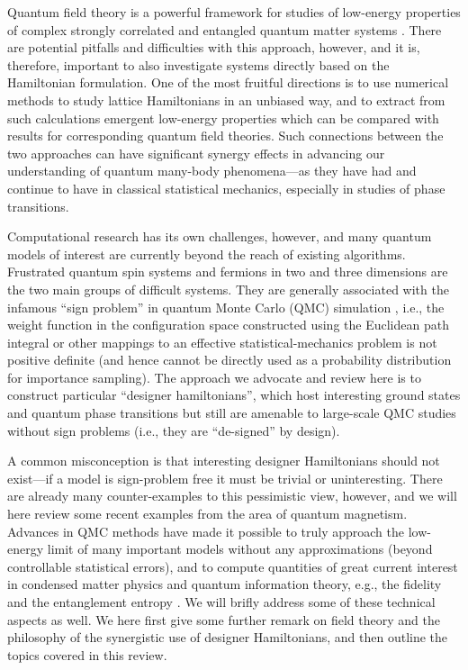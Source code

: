 \documentclass[range]{ar2e}
\begin{document}
Quantum field theory is a powerful framework for studies of low-energy properties of complex strongly 
correlated and entangled quantum matter systems \cite{Sachdev11}. There are potential pitfalls and difficulties 
with this approach, however, and it is, therefore, important to also investigate systems directly based on the Hamiltonian 
formulation. One of the most fruitful directions is to use numerical methods to study lattice Hamiltonians 
in an unbiased way, and to extract from such calculations emergent low-energy properties which can be 
compared with results for corresponding quantum field theories. Such connections between the two approaches 
can have significant synergy effects in advancing our understanding of quantum many-body phenomena---as they
have had and continue to have in classical statistical mechanics, especially in studies of phase transitions. 

Computational research has its own challenges, however, and many quantum models of interest are currently beyond the reach 
of existing algorithms. Frustrated quantum spin systems and fermions in two and three dimensions are the two main groups 
of difficult systems. They are generally associated with the infamous ``sign problem'' in quantum Monte Carlo (QMC) simulation
\cite{Loh90,Henelius00,Nyfeler08}, i.e., the weight function in the configuration space constructed using the Euclidean path 
integral or other mappings to an effective statistical-mechanics problem is not positive definite (and hence cannot be directly 
used as a probability distribution for importance sampling). The approach we advocate and review here is to construct particular 
``designer hamiltonians'', which host interesting ground states and quantum phase transitions but still are amenable to 
large-scale QMC studies without sign problems (i.e., they are ``de-signed'' by design). 

A common misconception is that interesting designer Hamiltonians should not exist---if a model is sign-problem 
free it must be trivial or uninteresting. There are already many counter-examples to this pessimistic view, 
however, and we will here review some recent examples from the area of quantum magnetism. Advances in QMC 
methods \cite{Sandvik91,Evertz93,Beard96,WormA,Sandvik99,Sandvik10a} have made it possible to truly approach the 
low-energy limit of many important models without any approximations (beyond controllable statistical errors), and to compute 
quantities of great current interest in condensed matter physics and quantum information theory, e.g., the fidelity 
\cite{Schwandt09,Degrandi11} and the entanglement entropy \cite{Hastings10}. We will brifly address some of these technical 
aspects as well. We here first give some further remark on field theory and the philosophy of the synergistic use of 
designer Hamiltonians, and then outline the topics covered in this review.
\end{document}
